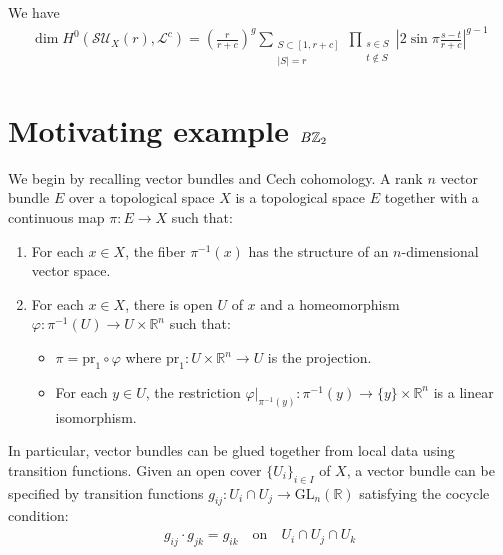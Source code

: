 \documentclass[12pt]{article}
\begin{document}
\begin{theorem}
     We have \begin{align*}
        \dim H^0(\mathcal{SU}_X(r), \mathcal{L}^c) = \left( \frac{r}{r+c} \right)^g \sum_{\substack{S \subset [1,r+c] \\ |S|=r}} \prod_{\substack{s \in S \\ t \notin S}} \left| 2 \sin \pi \frac{s-t}{r+c} \right|^{g-1}
    \end{align*}
\end{theorem}


\section{Motivating example $B\mathbb{Z}_2$}
We begin by recalling vector bundles and Cech cohomology. A rank $n$ vector bundle $E$ over a topological space $X$ is a topological space $E$ together with a continuous map $\pi: E \to X$ such that:
\begin{enumerate}
    \item For each $x \in X$, the fiber $\pi^{-1}(x)$ has the structure of an $n$-dimensional vector space.
    \item For each $x \in X$, there is open $U$ of $x$ and a homeomorphism $\varphi: \pi^{-1}(U) \to U \times \mathbb{R}^n$ such that:
          \begin{itemize}
              \item $\pi = \text{pr}_1 \circ \varphi$ where $\text{pr}_1: U \times \mathbb{R}^n \to U$ is the projection.
              \item For each $y \in U$, the restriction $\varphi|_{\pi^{-1}(y)}: \pi^{-1}(y) \to \{y\} \times \mathbb{R}^n$ is a linear isomorphism.
          \end{itemize}
\end{enumerate}

In particular, vector bundles can be glued together from local data using transition functions. Given an open cover $\{U_i\}_{i \in I}$ of $X$, a vector bundle can be specified by transition functions $g_{ij}: U_i \cap U_j \to \text{GL}_n(\mathbb{R})$ satisfying the cocycle condition:
\begin{align*}
    g_{ij} \cdot g_{jk} = g_{ik} \quad \text{on} \quad U_i \cap U_j \cap U_k
\end{align*}
\end{document}
